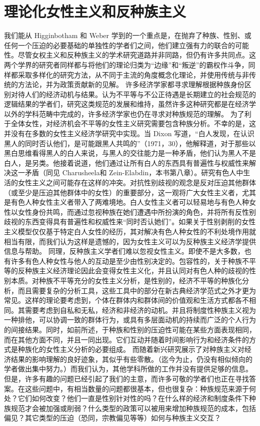 \documentclass[UTF8]{ctexart}
\begin{document}
\section{理论化女性主义和反种族主义}我们能从 Higginbotham 和 Weber 学到的一个重点是，在抛弃了种族、性别、或任何一个压迫的必要基础的单独性的学者们之间，他们建立强有力的联合的可能性。尽管女权主义和反种族主义的学术研究道路并非同路，但仍有许多共同点。这两个学界的研究者同样都与将他们的理论归类为“边缘”和“叛逆”的霸权作斗争，同样都采取多样化的研究方法，从不同于主流的角度概念化理论，并使用传统与非传统的方法论，并为政策贡献新的见解。
许多经济学家都寻求理解根据种族身份区别对待人们的经济动机与结果。认为不平等与不公正待遇是长期建立的社会规范的逻辑结果的学者们，研究这类规范的发展和维持，虽然许多这种研究都是在经济学以外的学科范畴中完成的，\cite{14}许多经济学家也仍在寻求对种族规范的理解。\cite{15}
为了利于全体女性，对经济机会不平等的女性主义研究需要包含种族分析。\cite{16}不幸的是，这并没有在多数的女性主义经济学研究中实现。当 Dixon 写道，“白人发现，在认识黑人的同时否认他们，是可能跟黑人共鸣的”（1971，30），他解释道，对于那些以黑白思维看得黑人的白人来说，与黑人的交往能力是一种矛盾，他们认为黑人不是白人，是另类。他接着说道，他们通过让所有白人的东西具有普遍性与权威性来解决这一矛盾（同见 Charusheela和 Zein-Elabdin，本书第八章）。研究有色人中生活的女性主义之间可能存在这样的冲突。对抗性别歧视的观念是反对压迫其他群体（或至少是压迫其他群体中的女性）的重要部分，这一观将广大女性主义者，尤其是有色人种女性主义者带入了两难境地。白人女性主义者可以轻易地与有色人种女性以女性身份共鸣，而通过忽视种族在她们遭遇中所扮演的角色，并将所有反性别歧视的东西变得具有普遍性和权威性来“同时否认她们”。如果关于性别剥削的女性主义模型仅仅基于特定白人女性的经历，其对解决有色人种女性的不利处境作用就相当有限，而我们认为这样是遗憾的，因为女性主义可以为反种族主义经济学提供信息与帮助。
同理，反种族主义学者们难以忽视女性主义。即使不是大多数，也有许多有色人种女性与他人的互动是至少由性别决定的。包容性的，关于种族不平等的反种族主义经济理论因此会变得女性主义化，并且认同对有色人种的歧视的性别本质。对种族不平等充分的女性主义分析，是性别的，经济不平等的种族化分析，而且需要复杂的分析工具，这些工具中的部分在新古典经济学范式之外才更为常见。这样的理论要考虑到，个体在群体内和群体间的价值观和生活方式都各不相同。其需要考虑到自私和无私，经济和非经济的动机。并且将制度性种族主义视为一种排他，可以协调一致的群体行为，或具有多层面动机的持续而广泛的个人行为的间接结果。同时，如前所述，于种族和性别的压迫性可能在某些方面表现相同，而在其他方面不同，并且一同出现。它们互动并随着时间影响行为和经济条件的方式是种族化的女性主义分析的必要组成。
而随着新兴研究展示了对种族主义对经济结果的影响理解的良好迹象，其似乎有些零散。（迄今为止，仍没有相似倾向的学者做出集中努力。）而我们认为，其他学科所做的工作并没有提供足够的信息。但是，许多有趣的问题已经引起了我们的主意，而许多可敬的学者们也正在寻找答案。在这些问题中，有相当数量的问题都很基本，但也很复杂：种族规范来源于何处？它们如何改变？他们一直是性别针对性的吗？在什么样的经济和制度条件下种族规范才会被加强或削弱？什么类型的政策可以被用来增加种族规范的成本，包括偏见？其它类型的压迫（恐同，宗教偏见等等）如何与种族主义交互？
\end{document}
